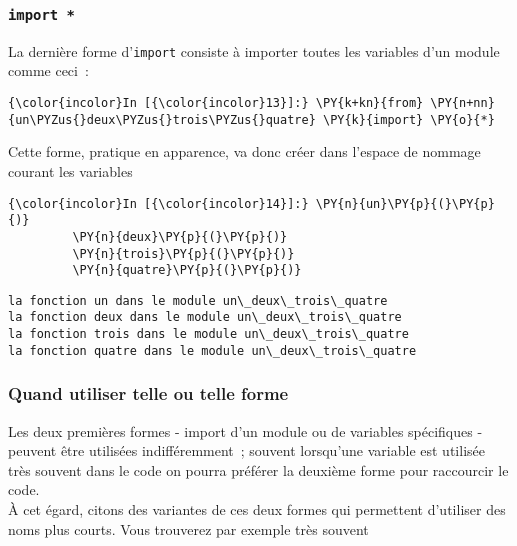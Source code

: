     \hypertarget{import}{%
\subsubsection{\texorpdfstring{\texttt{import\ *}}{import *}}\label{import}}

    La dernière forme d'\texttt{import} consiste à importer toutes les
variables d'un module comme ceci~:

    \begin{Verbatim}[commandchars=\\\{\}]
{\color{incolor}In [{\color{incolor}13}]:} \PY{k+kn}{from} \PY{n+nn}{un\PYZus{}deux\PYZus{}trois\PYZus{}quatre} \PY{k}{import} \PY{o}{*}
\end{Verbatim}


    Cette forme, pratique en apparence, va donc créer dans l'espace de
nommage courant les variables

    \begin{Verbatim}[commandchars=\\\{\}]
{\color{incolor}In [{\color{incolor}14}]:} \PY{n}{un}\PY{p}{(}\PY{p}{)}
         \PY{n}{deux}\PY{p}{(}\PY{p}{)}
         \PY{n}{trois}\PY{p}{(}\PY{p}{)}
         \PY{n}{quatre}\PY{p}{(}\PY{p}{)}
\end{Verbatim}


    \begin{Verbatim}[commandchars=\\\{\}]
la fonction un dans le module un\_deux\_trois\_quatre
la fonction deux dans le module un\_deux\_trois\_quatre
la fonction trois dans le module un\_deux\_trois\_quatre
la fonction quatre dans le module un\_deux\_trois\_quatre

    \end{Verbatim}

    \hypertarget{quand-utiliser-telle-ou-telle-forme}{%
\subsubsection{Quand utiliser telle ou telle
forme}\label{quand-utiliser-telle-ou-telle-forme}}

    Les deux premières formes - import d'un module ou de variables
spécifiques - peuvent être utilisées indifféremment~; souvent lorsqu'une
variable est utilisée très souvent dans le code on pourra préférer la
deuxième forme pour raccourcir le code.\\

    À cet égard, citons des variantes de ces deux formes qui permettent
d'utiliser des noms plus courts. Vous trouverez par exemple très souvent

